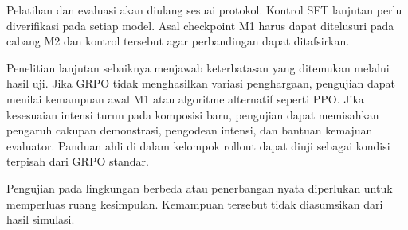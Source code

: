 Pelatihan dan evaluasi akan diulang sesuai protokol. Kontrol SFT lanjutan perlu diverifikasi pada setiap model. Asal checkpoint M1 harus dapat ditelusuri pada cabang M2 dan kontrol tersebut agar perbandingan dapat ditafsirkan.

Penelitian lanjutan sebaiknya menjawab keterbatasan yang ditemukan melalui hasil uji. Jika GRPO tidak menghasilkan variasi penghargaan, pengujian dapat menilai kemampuan awal M1 atau algoritme alternatif seperti PPO. Jika kesesuaian intensi turun pada komposisi baru, pengujian dapat memisahkan pengaruh cakupan demonstrasi, pengodean intensi, dan bantuan kemajuan evaluator. Panduan ahli di dalam kelompok rollout dapat diuji sebagai kondisi terpisah dari GRPO standar.

Pengujian pada lingkungan berbeda atau penerbangan nyata diperlukan untuk memperluas ruang kesimpulan. Kemampuan tersebut tidak diasumsikan dari hasil simulasi.
